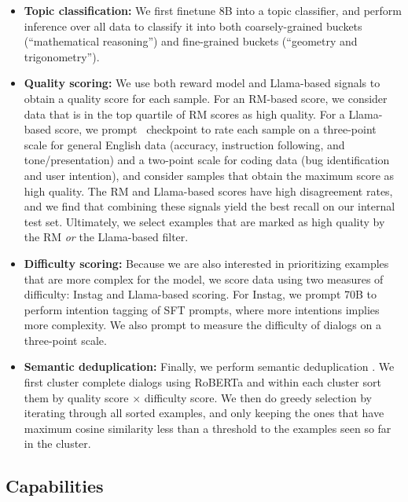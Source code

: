 \documentclass[dvipsnames]{fairmeta}
\begin{document}
\begin{itemize}
    \item \textbf{Topic classification:} We first finetune \llamathree 8B into a topic classifier, and perform inference over all data to classify it into both coarsely-grained buckets (``mathematical reasoning'') and fine-grained buckets (``geometry and trigonometry''). 

    \item \textbf{Quality scoring:} We use both reward model and Llama-based signals to obtain a quality score for each sample. 
    For an RM-based score, we consider data that is in the top quartile of RM scores as high quality.
    For a Llama-based score, we prompt \llamathree~checkpoint to rate each sample on a three-point scale for general English data (accuracy, instruction following, and tone/presentation) and a two-point scale for coding data (bug identification and user intention), and consider samples that obtain the maximum score as high quality. 
    The RM and Llama-based scores have high disagreement rates, and we find that combining these signals yield the best recall on our internal test set. Ultimately, we select examples that are marked as high quality by the RM \emph{or} the Llama-based filter. 

    \item \textbf{Difficulty scoring:} 
    Because we are also interested in prioritizing examples that are more complex for the model, we score data using two measures of difficulty: Instag \citep{lu2023instag} and Llama-based scoring. For Instag, we prompt \llamathree 70B to perform intention tagging of SFT prompts, where more intentions implies more complexity. We also prompt \llamathree to measure the difficulty \citep{liu2024makesgooddataalignment} of dialogs on a three-point scale. 

    \item \textbf{Semantic deduplication:} Finally, we perform semantic deduplication \citep{abbas2023semdedup, liu2024makesgooddataalignment}. We first cluster complete dialogs using RoBERTa \citep{liu_ott_roberta} and within each cluster sort them by quality score $\times$ difficulty score. We then do greedy selection by iterating through all sorted examples, and only keeping the ones that have maximum cosine similarity less than a threshold to the examples seen so far in the cluster.

\end{itemize}

\subsection{Capabilities}
\label{sec:Capabilities}
\end{document}

